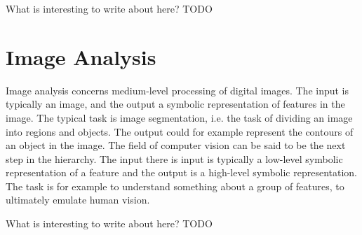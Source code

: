 What is interesting to write about here? TODO %
\section{Image Analysis}
Image analysis concerns medium-level processing of digital images. The input is typically an image, and the output a symbolic representation of features in the image. The typical task is image segmentation, i.e. the task of dividing an image into regions and objects. The output could for example represent the contours of an object in the image. \cite[p. 1-2]{pitas}\cite[p. 1-2]{gonzalez-woods}
The field of computer vision can be said to be the next step in the hierarchy. 
The input there is input is typically a low-level symbolic representation of a feature and the output is a high-level symbolic representation. 
The task is for example to understand something about a group of features, to ultimately emulate human vision. \cite[p. 1-3]{pitas}\cite[p. 1-3]{gonzalez-woods}

What is interesting to write about here? TODO %





















